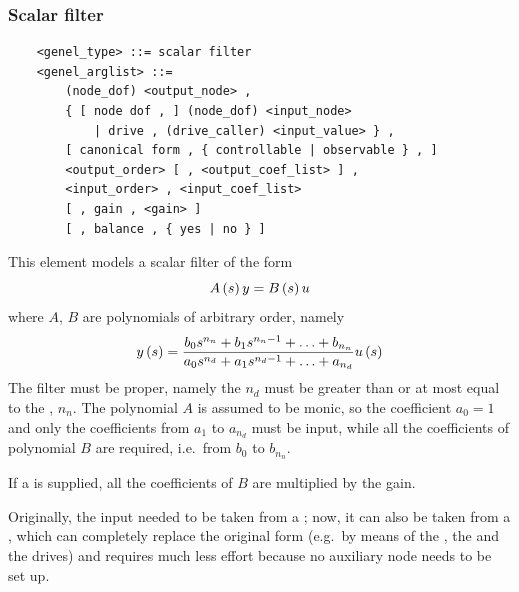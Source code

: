 \subsubsection{Scalar filter}
\begin{verbatim}
    <genel_type> ::= scalar filter
    <genel_arglist> ::=
        (node_dof) <output_node> ,
        { [ node dof , ] (node_dof) <input_node>
            | drive , (drive_caller) <input_value> } ,
        [ canonical form , { controllable | observable } , ]
        <output_order> [ , <output_coef_list> ] ,
        <input_order> , <input_coef_list>
        [ , gain , <gain> ]
        [ , balance , { yes | no } ]
\end{verbatim}
This element models a scalar filter of the form
\begin{displaymath}
    A\left( s \right)y = B\left( s \right)u
\end{displaymath}
where $ A $, $ B $ are polynomials of arbitrary order, namely
\begin{displaymath}
	y\left( s \right) = \frac{
		b_0 s^{n_n}
		+ b_1 s^{n_n-1}
		+ \ldots
		+ b_{n_n}
	}{
		a_0 s^{n_d}
		+ a_1 s^{n_d-1}
		+ \ldots
		+ a_{n_d}
	} u\left( s \right)
\end{displaymath}
The filter must be proper, namely the  $n_d$
must be greater than or at most equal to the , $n_n$.
The polynomial $ A $ is assumed to be monic, so the coefficient 
$a_0=1$ and only the coefficients from $a_1$ to $a_{n_d}$ must be input,
while all the coefficients of polynomial $ B $ are required,
i.e.\ from $b_0$ to $b_{n_n}$.

If a  is supplied, all the coefficients of $ B $
are multiplied by the gain.

Originally, the input needed to be taken from a ;
now, it can also be taken from a , which can completely replace
the original form (e.g.\ by means of the , the 
and the  drives) and requires much less effort because
no auxiliary node needs to be set up.

